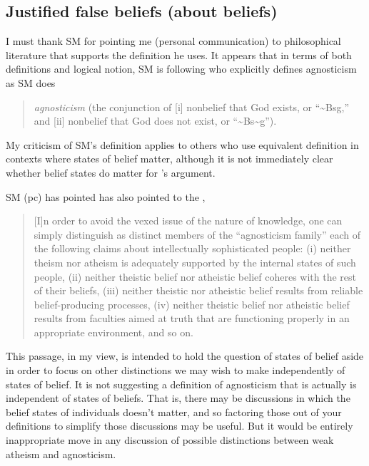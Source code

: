 \documentclass[12pt]{article}
\begin{document}
\subsection{Justified false beliefs (about beliefs)}

I must thank SM for pointing me (personal communication) to philosophical literature that supports the definition he uses.
It appears that in terms of both definitions and logical notion, SM is following \cite{Burgess-Jackson:2018ul} who explicitly defines agnosticism as SM does
\begin{quotation}
    \emph{agnosticism} (the conjunction of 
       [i] nonbelief that God exists, or “\textasciitilde Bsg,” and
       [ii] nonbelief that God does not exist, or “\textasciitilde Bs\textasciitilde g”).
\end{quotation}
My criticism of SM's definition applies to others who use equivalent definition in contexts where states of belief matter, although it is not immediately clear whether belief states do matter for \cite{Burgess-Jackson:2018ul}'s argument.

SM (pc) has pointed has also pointed to the \cite{sep-atheism-agnosticism}, 

\begin{quotation}
    [I]n order to avoid the vexed issue of the nature of knowledge, one can simply distinguish as distinct members of the “agnosticism family” each of the following claims about intellectually sophisticated people: (i) neither theism nor atheism is adequately supported by the internal states of such people, (ii) neither theistic belief nor atheistic belief coheres with the rest of their beliefs, (iii) neither theistic nor atheistic belief results from reliable belief-producing processes, (iv) neither theistic belief nor atheistic belief results from faculties aimed at truth that are functioning properly in an appropriate environment, and so on.
\end{quotation}
This passage, in my view, is intended to hold the question of states of belief aside in order to focus on other distinctions we may wish to make independently of states of belief.
It is not suggesting a definition of agnosticism that is actually is independent of states of beliefs.
That is, there may be discussions in which the belief states of individuals doesn't matter, and so factoring those out of your definitions to simplify those discussions may be useful.
But it would be entirely inappropriate move in any discussion of possible distinctions between weak atheism and agnosticism.
\end{document}
